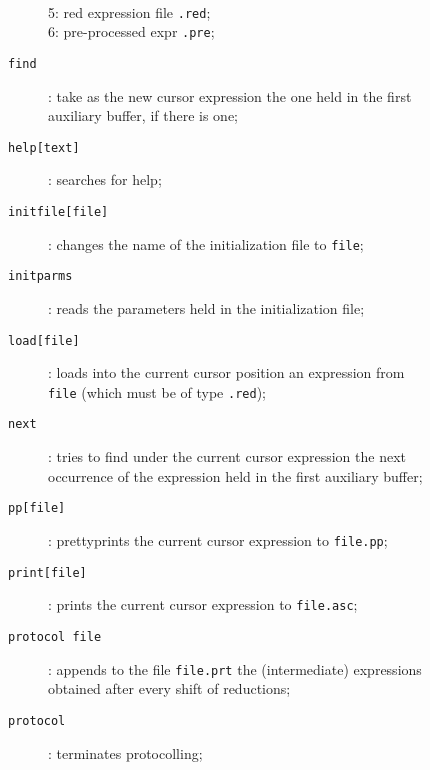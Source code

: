 \begin{description}
\begin{description}
\begin{description}
\\5: red expression file {\tt .red};
\\6: pre-processed expr  {\tt .pre};          
\\
\item[{\tt find}]: take as the new cursor expression the one held in the
 first auxiliary buffer, if there is one;
\item[{\tt help[text]}]: searches for help;
\item[{\tt initfile[file]}]: changes the name of the initialization 
file to {\tt file};
\item[{\tt initparms}]: reads the parameters held in the initialization file;
\item[{\tt load[file]}]: loads into the current cursor position an 
expression from {\tt file} (which must be of type {\tt .red});
\item[{\tt next}]: tries to find under the current cursor expression 
the next occurrence of the expression
held in the first auxiliary buffer;
\item[{\tt pp[file]}]: prettyprints the current cursor expression
to {\tt file.pp};
\item[{\tt print[file]}]: prints the current cursor expression to
{\tt file.asc};
\item[{\tt protocol file}]: appends to the file {\tt file.prt}
the (intermediate) expressions obtained after every shift of reductions;
\item[{\tt protocol}]: terminates protocolling;


\end{description}
\end{description}
\end{description}
